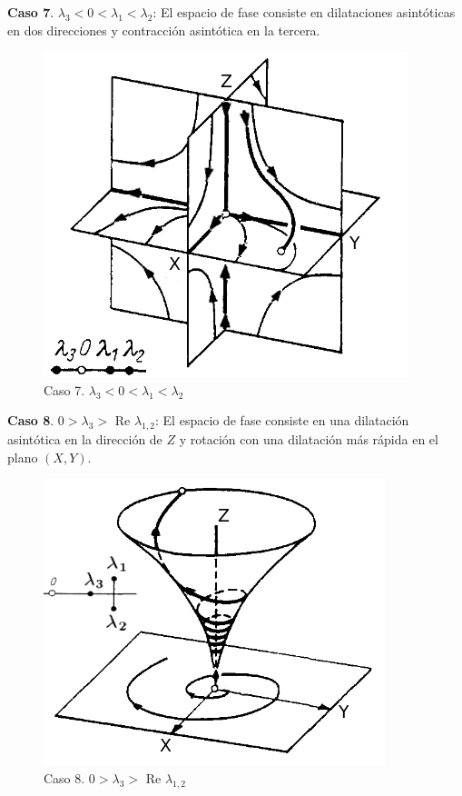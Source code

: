 \documentclass[a4paper,10pt]{article}
\numberwithin{equation}{section}
\begin{document}
\textbf{Caso 7}. $\lambda_3 < 0 < \lambda_1 < \lambda_2$: El espacio de fase consiste en dilataciones asintóticas
en dos direcciones y contracción asintótica en la tercera.

\begin{figure}[h!]
 \centering
\includegraphics[scale=0.35]{problema3fig8}
\caption{Caso 7. $\lambda_3 < 0 < \lambda_1 < \lambda_2$}
\label{fig:problema3fig8}
\end{figure}
\vspace{.3cm}

\textbf{Caso 8}. $0 > \lambda_3 > $ Re $\lambda_{1,2}$: El espacio de fase consiste en una dilatación asintótica en 
la dirección de $Z$ y rotación con una dilatación más rápida en el plano $(X,Y)$.

\begin{figure}[h!]
 \centering
\includegraphics[scale=0.35]{problema3fig9}
\caption{Caso 8. $0 > \lambda_3 > $ Re $\lambda_{1,2}$}
\label{fig:problema3fig9}
\end{figure}
\vspace{.3cm}
\end{document}
